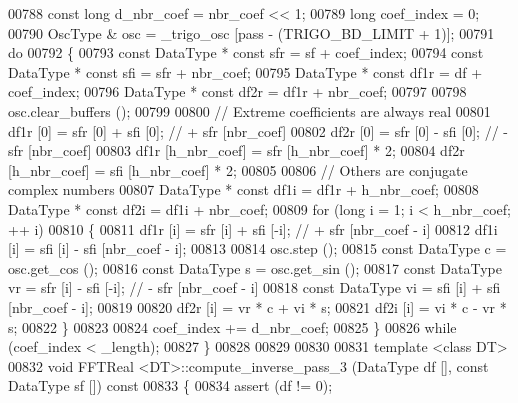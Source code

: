 \begin{DoxyCode}
00788     \textcolor{keyword}{const} \textcolor{keywordtype}{long}      d\_nbr\_coef = nbr\_coef << 1;
00789     \textcolor{keywordtype}{long}                coef\_index = 0;
00790     OscType &       osc = \_trigo\_osc [pass - (TRIGO\_BD\_LIMIT + 1)];
00791     \textcolor{keywordflow}{do}
00792     \{
00793         \textcolor{keyword}{const} DataType  * \textcolor{keyword}{const} sfr = sf + coef\_index;
00794         \textcolor{keyword}{const} DataType  * \textcolor{keyword}{const} sfi = sfr + nbr\_coef;
00795         DataType            * \textcolor{keyword}{const} df1r = df + coef\_index;
00796         DataType            * \textcolor{keyword}{const} df2r = df1r + nbr\_coef;
00797 
00798         osc.clear\_buffers ();
00799 
00800         \textcolor{comment}{// Extreme coefficients are always real}
00801         df1r [0] = sfr [0] + sfi [0];       \textcolor{comment}{// + sfr [nbr\_coef]}
00802         df2r [0] = sfr [0] - sfi [0];       \textcolor{comment}{// - sfr [nbr\_coef]}
00803         df1r [h\_nbr\_coef] = sfr [h\_nbr\_coef] * 2;
00804         df2r [h\_nbr\_coef] = sfi [h\_nbr\_coef] * 2;
00805 
00806         \textcolor{comment}{// Others are conjugate complex numbers}
00807         DataType * \textcolor{keyword}{const}    df1i = df1r + h\_nbr\_coef;
00808         DataType * \textcolor{keyword}{const}    df2i = df1i + nbr\_coef;
00809         \textcolor{keywordflow}{for} (\textcolor{keywordtype}{long} i = 1; i < h\_nbr\_coef; ++ i)
00810         \{
00811             df1r [i] = sfr [i] + sfi [-i];      \textcolor{comment}{// + sfr [nbr\_coef - i]}
00812             df1i [i] = sfi [i] - sfi [nbr\_coef - i];
00813 
00814             osc.step ();
00815             \textcolor{keyword}{const} DataType  c = osc.get\_cos ();
00816             \textcolor{keyword}{const} DataType  s = osc.get\_sin ();
00817             \textcolor{keyword}{const} DataType  vr = sfr [i] - sfi [-i];        \textcolor{comment}{// - sfr [nbr\_coef - i]}
00818             \textcolor{keyword}{const} DataType  vi = sfi [i] + sfi [nbr\_coef - i];
00819 
00820             df2r [i] = vr * c + vi * s;
00821             df2i [i] = vi * c - vr * s;
00822         \}
00823 
00824         coef\_index += d\_nbr\_coef;
00825     \}
00826     \textcolor{keywordflow}{while} (coef\_index < \_length);
00827 \}
00828 
00829 
00830 
00831 \textcolor{keyword}{template} <\textcolor{keyword}{class} DT>
00832 \textcolor{keywordtype}{void}    FFTReal <DT>::compute\_inverse\_pass\_3 (DataType df [], \textcolor{keyword}{const} DataType sf []) \textcolor{keyword}{const}
00833 \{
00834     assert (df != 0);

\end{DoxyCode}
